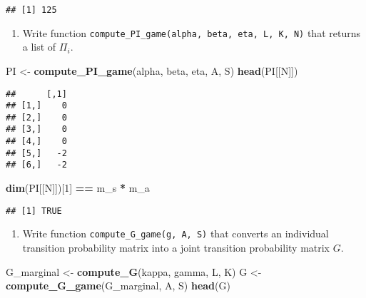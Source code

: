 \documentclass[
]{book}
\newenvironment{Shaded}{\begin{snugshade}}{\end{snugshade}}
\newcommand{\DecValTok}[1]{\textcolor[rgb]{0.00,0.00,0.81}{#1}}
\newcommand{\KeywordTok}[1]{\textcolor[rgb]{0.13,0.29,0.53}{\textbf{#1}}}
\newcommand{\NormalTok}[1]{#1}
\newcommand{\OperatorTok}[1]{\textcolor[rgb]{0.81,0.36,0.00}{\textbf{#1}}}
\newcommand{\StringTok}[1]{\textcolor[rgb]{0.31,0.60,0.02}{#1}}
\providecommand{\tightlist}{%
  \setlength{\itemsep}{0pt}\setlength{\parskip}{0pt}}
\begin{document}
\begin{verbatim}
## [1] 125
\end{verbatim}

\begin{enumerate}
\def\labelenumi{\arabic{enumi}.}
\setcounter{enumi}{2}
\tightlist
\item
  Write function \texttt{compute\_PI\_game(alpha,\ beta,\ eta,\ L,\ K,\ N)} that returns a list of \(\Pi_i\).
\end{enumerate}

\begin{Shaded}
\begin{Highlighting}[]
\NormalTok{PI <-}\StringTok{ }\KeywordTok{compute_PI_game}\NormalTok{(alpha, beta, eta, A, S)}
\KeywordTok{head}\NormalTok{(PI[[N]])}
\end{Highlighting}
\end{Shaded}

\begin{verbatim}
##      [,1]
## [1,]    0
## [2,]    0
## [3,]    0
## [4,]    0
## [5,]   -2
## [6,]   -2
\end{verbatim}

\begin{Shaded}
\begin{Highlighting}[]
\KeywordTok{dim}\NormalTok{(PI[[N]])[}\DecValTok{1}\NormalTok{] }\OperatorTok{==}\StringTok{ }\NormalTok{m_s }\OperatorTok{*}\StringTok{ }\NormalTok{m_a}
\end{Highlighting}
\end{Shaded}

\begin{verbatim}
## [1] TRUE
\end{verbatim}

\begin{enumerate}
\def\labelenumi{\arabic{enumi}.}
\setcounter{enumi}{3}
\tightlist
\item
  Write function \texttt{compute\_G\_game(g,\ A,\ S)} that converts an individual transition probability matrix into a joint transition probability matrix \(G\).
\end{enumerate}

\begin{Shaded}
\begin{Highlighting}[]
\NormalTok{G_marginal <-}\StringTok{ }\KeywordTok{compute_G}\NormalTok{(kappa, gamma, L, K)}
\NormalTok{G <-}\StringTok{ }\KeywordTok{compute_G_game}\NormalTok{(G_marginal, A, S)}
\KeywordTok{head}\NormalTok{(G)}
\end{Highlighting}
\end{Shaded}
\end{document}
